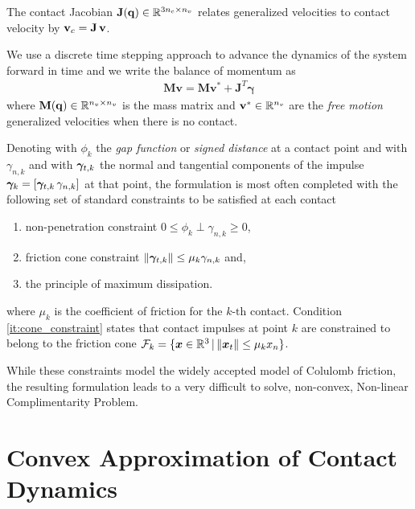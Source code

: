 The contact Jacobian ${\mathbf{J}}({\mathbf{q}})\in\mathbb{R}^{3n_c\times n_v}$ relates
generalized velocities to contact velocity by ${\mathbf{v}}_c={\mathbf{J}}\,{\mathbf{v}}$.

We use a discrete time stepping approach to advance the dynamics of the system
forward in time and we write the balance of momentum as
\begin{eqnarray}
	\mathbf{M}\mathbf{v} = \mathbf{M}\mathbf{v}^* + \mathbf{J}^T\mathbf{\gamma}
	\label{eq:momentum_balance}
\end{eqnarray}
where ${\mathbf{M}}({\mathbf{q}})\in\mathbb{R}^{n_v\times n_v}$ is the mass matrix and
${\mathbf{v}}^*\in\mathbb{R}^{n_v}$ are the \textit{free motion} generalized
velocities when there is no contact.

Denoting with $\phi_k$ the \textit{gap function} or \textit{signed distance} at
a contact point and with $\gamma_{n,k}$ and with ${\bm\gamma}_{t,k}$ the normal and
tangential components of the impulse ${\bm\gamma}_k=[{\bm\gamma}_{t,k}\,\gamma_{n,k}]$
at that point, the formulation is most often completed with the following set of
standard constraints to be satisfied at each contact
\begin{enumerate}
	\item non-penetration constraint $0\le\phi_k\perp\gamma_{n,k}\ge0$,
	\item\label{it:cone_constraint} friction cone constraint
	$\Vert{\bm\gamma}_{t,k}\Vert\le \mu_k\gamma_{n,k}$ and,
	\item the principle of maximum dissipation.
\end{enumerate}
where $\mu_k$ is the coefficient of friction for the $k\text{-th}$ contact.
Condition \ref{it:cone_constraint} states that contact impulses at point $k$ are
constrained to belong to the friction cone
$\mathcal{F}_k=\{{\bm{x}}\in\mathbb{R}^3 \,|\, \Vert{\bm{x}}_t\Vert\le \mu_k x_n\}$.

While these constraints model the widely accepted model of Colulomb friction,
the resulting formulation leads to a very difficult to solve, non-convex,
Non-linear Complimentarity Problem. 



\section{Convex Approximation of Contact Dynamics}
\label{sec:previous_work}


